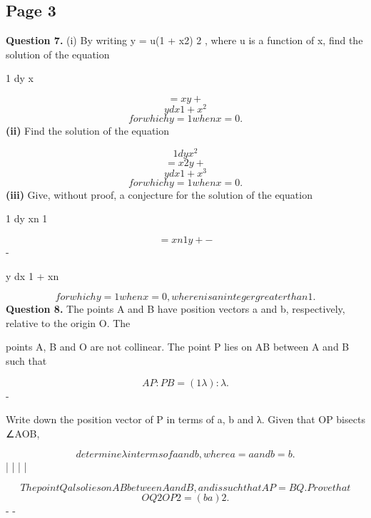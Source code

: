 \documentclass[12pt]{article}
\begin{document}
\subsection*{Page 3}
\begin{flushleft}
\bigskip\textbf{Question 7.} (i) By writing y = u(1 + x2) 2 , where u is a function of x, find the solution of the equation\par
1 dy x\par
\[= xy +\]
\[y dx 1 + x^2\]
\[for which y = 1 when x = 0.\]
\textbf{(ii)} Find the solution of the equation\par
\[1 dy x^2\]
\[= x2y +\]
\[y dx 1 + x^3\]
\[for which y = 1 when x = 0.\]
\textbf{(iii)} Give, without proof, a conjecture for the solution of the equation\par
1 dy xn 1\par
\[= xn 1y + -\]
-\par
y dx 1 + xn\par
\[for which y = 1 when x = 0, where n is an integer greater than 1.\]
\bigskip\textbf{Question 8.} The points A and B have position vectors a and b, respectively, relative to the origin O. The\par
points A, B and O are not collinear. The point P lies on AB between A and B such that\par
\[AP : P B = (1 λ) : λ .\]
-\par
Write down the position vector of P in terms of a, b and λ. Given that OP bisects ∠AOB,\par
\[determine λ in terms of a and b, where a = a and b = b .\]
| | | |\par
\[The point Q also lies on AB between A and B, and is such that AP = BQ. Prove that\]
\[OQ2 OP 2 = (b a)2 .\]
- -\par
\end{flushleft}
\end{document}

